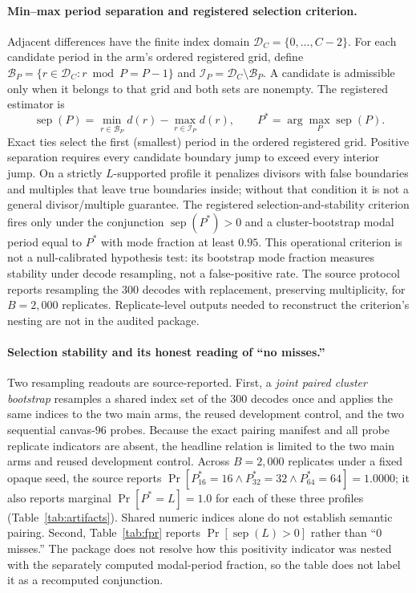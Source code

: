 \documentclass{article}
\begin{document}
\paragraph{Min--max period separation and registered selection criterion.}
Adjacent differences have the finite index domain
$\mathcal D_C=\{0,\ldots,C-2\}$.  For each candidate period in the arm's ordered
registered grid, define
$\mathcal B_P=\{r\in\mathcal D_C:r\bmod P=P-1\}$ and
$\mathcal I_P=\mathcal D_C\setminus\mathcal B_P$.  A candidate is admissible
only when it belongs to that grid and both sets are nonempty.
The registered estimator is
\begin{equation}
\operatorname{sep}(P)=\min_{r\in\mathcal B_P}d(r)
-\max_{r\in\mathcal I_P}d(r),\qquad
P^*=\arg\max_P\operatorname{sep}(P).
\label{eq:sep}
\end{equation}
Exact ties select the first (smallest) period in the ordered registered grid.
Positive separation requires every candidate boundary jump to exceed every
interior jump. On a strictly $L$-supported profile it penalizes divisors with
false boundaries and multiples that leave true boundaries inside; without that
condition it is not a general divisor/multiple guarantee.  The registered
selection-and-stability criterion fires only under the conjunction
$\operatorname{sep}(P^*)>0$ and a cluster-bootstrap modal period equal to $P^*$
with mode fraction at least $0.95$.  This operational criterion is not a
null-calibrated hypothesis test: its bootstrap mode fraction measures stability
under decode resampling, not a false-positive rate.  The source protocol reports
resampling the $300$ decodes with replacement, preserving multiplicity, for
$B{=}2{,}000$ replicates.  Replicate-level outputs needed to reconstruct the
criterion's nesting are not in the audited package.

\paragraph{Selection stability and its honest reading of ``no misses.''}
Two resampling readouts are source-reported. First, a \emph{joint paired cluster
bootstrap} resamples a shared index set of the $300$ decodes once and applies the
same indices to the two main arms, the reused development control, and the two
sequential canvas-$96$ probes.  Because the exact pairing manifest and all probe
replicate indicators are absent, the headline relation is limited to the two
main arms and reused development control. Across $B{=}2{,}000$ replicates under
a fixed opaque seed, the source reports
$\Pr[P^*_{16}{=}16\wedge P^*_{32}{=}32\wedge P^*_{64}{=}64]=1.0000$;
it also reports marginal $\Pr[P^*{=}L]=1.0$ for each of these three profiles
(Table~\ref{tab:artifacts}). Shared numeric indices alone do not establish
semantic pairing. Second,
Table~\ref{tab:fpr} reports $\Pr[\operatorname{sep}(L)>0]$ rather than ``$0$
misses.''  The package does not resolve how this positivity indicator was nested
with the separately computed modal-period fraction, so the table does not label
it as a recomputed conjunction.
\end{document}
